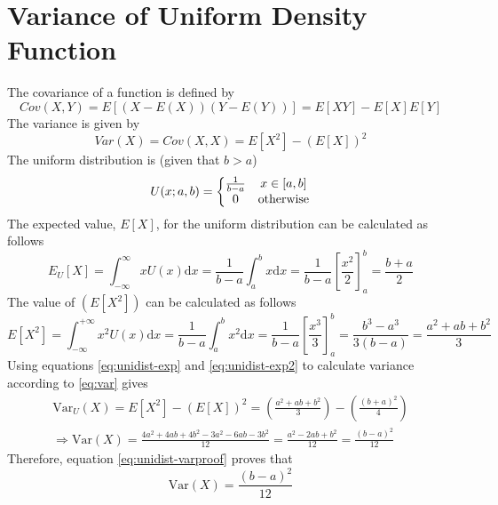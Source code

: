 \documentclass[main.tex]{article}
\begin{document}
    \section[P2: Variance of UDF]{Variance of Uniform Density Function}
    The covariance of a function is defined by
    \begin{equation}
        Cov(X, Y) = E \left [ \left ( X - E(X) \right )  \left ( Y - E(Y) \right ) \right ] = E[XY] - E[X]E[Y]
    \end{equation}
    The variance is given by
    \begin{equation}
        \label{eq:var}
        Var(X) = Cov(X, X) = E[X^2] - \left ( E[X] \right )^2
    \end{equation}
    The uniform distribution is (given that $b>a$)
    \begin{equation}
        \label{eq:unidist}
        U(x;a,b) = \left\{\begin{matrix}
        \frac{1}{b-a} & x \in [a,b] \\
        0 & \textup{otherwise}
        \end{matrix}\right.
    \end{equation}
    The expected value, $E[X]$, for the uniform distribution can be calculated as follows
    \begin{equation}
        \label{eq:unidist-exp}
        E_U[X] = \int_{-\infty}^{\infty} x U(x) \mathrm{d}x = \frac{1}{b-a} \int_{a}^{b} x \mathrm{d}x = \frac{1}{b-a} \left [ \frac{x^2}{2} \right ]_{a}^{b} = \frac{b+a}{2}
    \end{equation}
    The value of $(E[X^2])$ can be calculated as follows
    \begin{equation}
        \label{eq:unidist-exp2}
        E[X^2] = \int_{-\infty}^{+\infty} x^2 U(x) \mathrm{d}x = \frac{1}{b-a} \int_{a}^{b} x^2 \mathrm{d}x = \frac{1}{b-a} \left[ \frac{x^3}{3} \right ]_a^b = \frac{b^3-a^3}{3(b-a)} = \frac{a^2+ab+b^2}{3}
    \end{equation}
    Using equations \ref{eq:unidist-exp} and \ref{eq:unidist-exp2} to calculate variance according to \ref{eq:var} gives
    \begin{equation}
        \begin{matrix}
            \label{eq:unidist-varproof}
            \mathrm{Var}_{U}(X) = E[X^2]-\left(E[X]\right)^2 = \left(\frac{a^2+ab+b^2}{3}\right) - \left(\frac{(b+a)^2}{4}\right) \\
            \Rightarrow \mathrm{Var}(X) = \frac{4a^2+4ab+4b^2-3a^2-6ab-3b^2}{12} = \frac{a^2-2ab+b^2}{12} = \frac{(b-a)^2}{12}
            \end{matrix}
    \end{equation}
    Therefore, equation \ref{eq:unidist-varproof} proves that
    \begin{equation}
        \label{eq:unidist-var}
        \mathrm{Var}(X) = \frac{(b-a)^2}{12}
    \end{equation}
\end{document}
